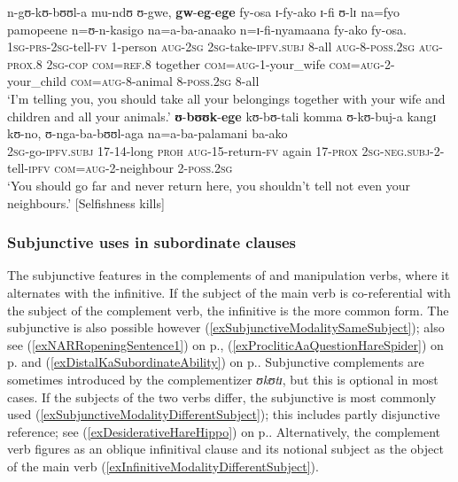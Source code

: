 \begin{exe}
\ex  \label{exSUBJegeRecommendation}
\gll n-gʊ-kʊ-bʊʊl-a mu-ndʊ ʊ-gwe, \textbf{gw}-\textbf{eg}-\textbf{ege} fy-osa ɪ-fy-ako ɪ-fi ʊ-lɪ na=fyo pamopeene n=ʊ-n-kasigo na=a-ba-anaako n=ɪ-fi-nyamaana fy-ako fy-osa.\\
\textsc{1sg}-\textsc{prs}-\textsc{2sg}-tell-\textsc{fv} 1-person \textsc{aug}-\textsc{2sg} \textsc{2sg}-take-\textsc{ipfv.subj} 8-all \textsc{aug}-8-\textsc{poss.2sg} \textsc{aug}-\textsc{prox.8} \textsc{2sg}-\textsc{cop} \textsc{com}=\textsc{ref.8} together \textsc{com}=\textsc{aug}-1-your\_wife \textsc{com}=\textsc{aug}-2-your\_child \textsc{com}=\textsc{aug}-8-animal 8-\textsc{poss.2sg} 8-all\\
\glt `I'm telling you, you should take all your belongings together with your wife and children and all your animals.'
\sn \gll \textbf{ʊ}-\textbf{bʊʊk}-\textbf{ege} kʊ-bʊ-tali komma ʊ-kʊ-buj-a kangɪ kʊ-no, ʊ-nga-ba-bʊʊl-aga na=a-ba-palamani ba-ako\\
\textsc{2sg}-go-\textsc{ipfv.subj} 17-14-long \textsc{proh} \textsc{aug}-15-return-\textsc{fv} again 17-\textsc{prox} \textsc{2sg}-\textsc{neg.subj}-2-tell-\textsc{ipfv} \textsc{com}=\textsc{aug}-2-neighbour 2-\textsc{poss.2sg}\\
\glt  \lq You should go far and never return here, you shouldn't tell not even your neighbours.' [Selfishness kills]
\end{exe}

\subsubsection{Subjunctive uses in subordinate clauses}\label{SubjunctiveSubordinate}
The subjunctive features in the complements of  and manipulation verbs, where it alternates with the infinitive. If the subject of the main verb is co-referential with the subject of the complement verb, the infinitive is the more common form. The subjunctive is also possible however (\ref{exSubjunctiveModalitySameSubject}); also see 
(\ref{exNARRopeningSentence1}) on p.\nobreakspace\pageref{exNARRopeningSentence1}, (\ref{exProcliticAaQuestionHareSpider}) on p.\nobreakspace\pageref{exProcliticAaQuestionHareSpider} and
(\ref{exDistalKaSubordinateAbility}) on p.\nobreakspace\pageref{exDistalKaSubordinateAbility}. Subjunctive complements are sometimes introduced by the complementizer \textit{ʊkʊtɪ}, but this is optional in most cases. If the subjects of the two verbs differ, the subjunctive is most commonly used (\ref{exSubjunctiveModalityDifferentSubject}); this includes partly disjunctive reference; see (\ref{exDesiderativeHareHippo}) on p.\nobreakspace\pageref{exDesiderativeHareHippo}. Alternatively, the complement verb figures as an oblique infinitival clause and its notional subject as the object of the main verb (\ref{exInfinitiveModalityDifferentSubject}).

